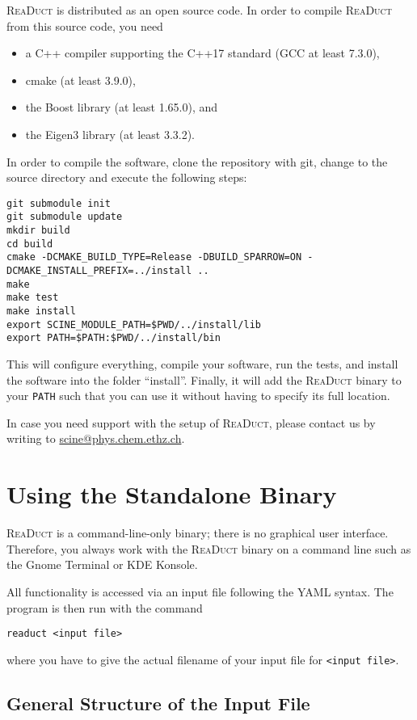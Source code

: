 \documentclass[]{tufte-book}
\begin{document}
\textsc{ReaDuct} is distributed as an open source code. In order to compile \textsc{ReaDuct} from this source code, you need
\begin{itemize}
 \item a C++ compiler supporting the C++17 standard (GCC at least 7.3.0),
 \item cmake (at least 3.9.0),
 \item the Boost library (at least 1.65.0), and
 \item the Eigen3 library (at least 3.3.2).
\end{itemize}
In order to compile the software, clone the repository with git, change
to the source directory and execute the following steps:
\begin{verbatim}
git submodule init
git submodule update
mkdir build
cd build
cmake -DCMAKE_BUILD_TYPE=Release -DBUILD_SPARROW=ON -DCMAKE_INSTALL_PREFIX=../install ..
make
make test
make install
export SCINE_MODULE_PATH=$PWD/../install/lib
export PATH=$PATH:$PWD/../install/bin
\end{verbatim}
This will configure everything, compile your software, run the tests, and install the software
into the folder ``install''. Finally, it will add the \textsc{ReaDuct} binary to your \texttt{PATH} such that you can use
it without having to specify its full location.

In case you need support with the setup of \textsc{ReaDuct}, please contact us by writing to \href{scine@phys.chem.ethz.ch}{scine@phys.chem.ethz.ch}.



\chapter{Using the Standalone Binary}

\textsc{ReaDuct} is a command-line-only binary; there is no graphical user interface. Therefore, you always work with the
\textsc{ReaDuct} binary on a command line such as the Gnome Terminal or KDE Konsole.

All functionality is accessed via an input file following the YAML syntax. The program is then run with the
command

\begin{verbatim}
readuct <input file>
\end{verbatim}

where you have to give the actual filename of your input file for \texttt{<input file>}.


\section{General Structure of the Input File}
\end{document}
